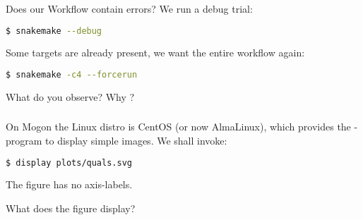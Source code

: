 \begin{frame}[fragile]
  \frametitle{}
  Does our Workflow contain errors? We run a debug trial:
  \begin{lstlisting}[language=Bash, style=Shell]
$ snakemake --debug
  \end{lstlisting}
  \pause
  Some targets are already present, we want the entire workflow again:
  \begin{lstlisting}[language=Bash, style=Shell]
$ snakemake -c4 --forcerun
  \end{lstlisting}
  \begin{question}
  	What do you observe? Why ?
  \end{question}
\end{frame}

\begin{frame}[fragile]
  \frametitle{}
  On Mogon the Linux distro is CentOS (or now AlmaLinux), which provides the -program to display simple images. We shall invoke:
  \begin{lstlisting}[language=Bash, style=Shell]
$ display plots/quals.svg
  \end{lstlisting}
  The figure has no axis-labels.
  \begin{question}
  	What does the figure display?
  \end{question}
\end{frame}
